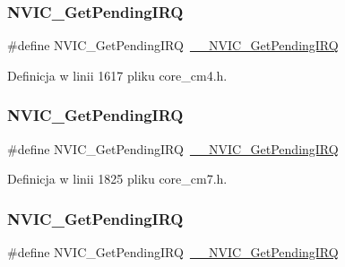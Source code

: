 \subsubsection{\texorpdfstring{N\+V\+I\+C\+\_\+\+Get\+Pending\+I\+RQ}{NVIC\_GetPendingIRQ}\hspace{0.1cm}{\footnotesize\ttfamily [9/12]}}
{\footnotesize\ttfamily \#define N\+V\+I\+C\+\_\+\+Get\+Pending\+I\+RQ~\hyperlink{group___c_m_s_i_s___core___n_v_i_c_functions_ga5a92ca5fa801ad7adb92be7257ab9694}{\+\_\+\+\_\+\+N\+V\+I\+C\+\_\+\+Get\+Pending\+I\+RQ}}



Definicja w linii 1617 pliku core\+\_\+cm4.\+h.

\mbox{\label{group___c_m_s_i_s___core___n_v_i_c_functions_gac608957a239466e9e0cbc30aa64feb3b}} 
\subsubsection{\texorpdfstring{N\+V\+I\+C\+\_\+\+Get\+Pending\+I\+RQ}{NVIC\_GetPendingIRQ}\hspace{0.1cm}{\footnotesize\ttfamily [10/12]}}
{\footnotesize\ttfamily \#define N\+V\+I\+C\+\_\+\+Get\+Pending\+I\+RQ~\hyperlink{group___c_m_s_i_s___core___n_v_i_c_functions_ga5a92ca5fa801ad7adb92be7257ab9694}{\+\_\+\+\_\+\+N\+V\+I\+C\+\_\+\+Get\+Pending\+I\+RQ}}



Definicja w linii 1825 pliku core\+\_\+cm7.\+h.

\mbox{\label{group___c_m_s_i_s___core___n_v_i_c_functions_gac608957a239466e9e0cbc30aa64feb3b}} 
\subsubsection{\texorpdfstring{N\+V\+I\+C\+\_\+\+Get\+Pending\+I\+RQ}{NVIC\_GetPendingIRQ}\hspace{0.1cm}{\footnotesize\ttfamily [11/12]}}
{\footnotesize\ttfamily \#define N\+V\+I\+C\+\_\+\+Get\+Pending\+I\+RQ~\hyperlink{group___c_m_s_i_s___core___n_v_i_c_functions_ga5a92ca5fa801ad7adb92be7257ab9694}{\+\_\+\+\_\+\+N\+V\+I\+C\+\_\+\+Get\+Pending\+I\+RQ}}



